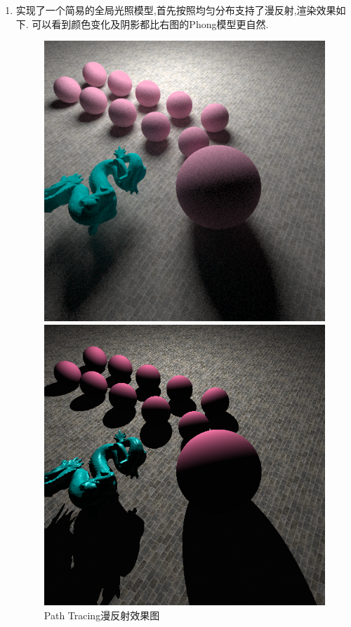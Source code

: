 \begin{enumerate}
  \item 实现了一个简易的全局光照模型,首先按照均匀分布支持了漫反射,渲染效果如下.
    可以看到颜色变化及阴影都比右图的Phong模型更自然.
    \begin{figure}[H]
      \begin{minipage}[b]{0.46\linewidth}
        \centering
        \includegraphics[width=\textwidth]{img/gllu_first.png}
      \end{minipage}
      \begin{minipage}[b]{0.46\linewidth}
        \centering
        \includegraphics[width=\textwidth]{img/compare_diffuse_phong.png}
      \end{minipage}
      \caption{Path Tracing漫反射效果图\label{fig:pt_diffuse}}
    \end{figure}


\end{enumerate}
